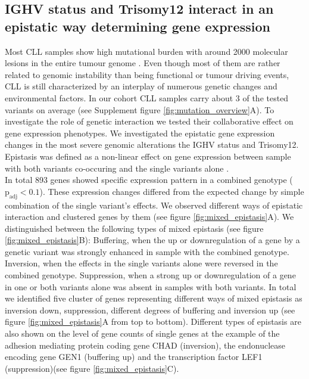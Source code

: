 \subsection{ IGHV status and Trisomy12 interact in an epistatic way determining gene expression}

Most CLL samples show high mutational burden with around 2000 molecular lesions in the entire tumour genome \citep{Gaidano2017}. Even though most of them are rather related to genomic instability than being functional or tumour driving events, CLL is still characterized by an interplay of numerous genetic changes and environmental factors. In our cohort CLL samples carry about 3 of the tested variants on average (see Supplement figure \ref{fig:mutation_overview}A). To investigate the role of genetic interaction we tested their collaborative effect on gene expression phenotypes. We investigated the epistatic gene expression changes in the most severe genomic alterations the IGHV status and Trisomy12. Epistasis was defined as a non-linear effect on gene expression between sample with both variants co-occuring and the single variants alone \citep{Fisher1919}. \\

In total 893 genes showed specific expression pattern in a combined genotype  
($\text{p}_\text{adj} < 0.1$). These expression changes differed from the expected change by simple combination of the single variant's effects. We observed different ways of epistatic interaction and clustered genes by them (see figure \ref{fig:mixed_epistasis}A). We distinguished between the following types of mixed epistasis (see figure \ref{fig:mixed_epistasis}B): Buffering, when the up or downregulation of a gene by a genetic variant was strongly enhanced in sample with the combined genotype. Inversion, when the effects in the single variants alone were reversed in the combined genotype. Suppression, when a strong up or downregulation of a gene in one or both variants alone was absent in samples with both variants. 
In total we identified five cluster of genes representing different ways of mixed epistasis as inversion down, suppression, different degrees of buffering and inversion up (see figure \ref{fig:mixed_epistasis}A from top to bottom). Different types of epistasis are also shown on the level of gene counts of single genes at the example of the adhesion mediating protein coding gene CHAD (inversion), the endonuclease encoding gene GEN1 (buffering up) and the transcription factor LEF1 (suppression)(see figure \ref{fig:mixed_epistasis}C). \\

